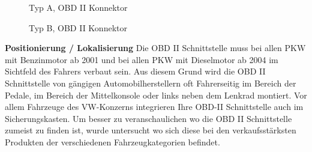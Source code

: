 \begin{figure}[!htb]\centering
   \begin{minipage}{0.49\textwidth}
     \caption{Typ A, OBD II Konnektor \cite{OBDII.TypeA}}\label{Fig:Data1}
   \end{minipage}
   \begin {minipage}{0.49\textwidth}
     \caption{Typ B, OBD II Konnektor \cite{OBDII.TypeB}}\label{Fig:Data2}
   \end{minipage}
\end{figure}


\textbf{Positionierung / Lokalisierung\nextline}
Die OBD II Schnittstelle muss bei allen PKW mit Benzinmotor ab 2001 und bei allen PKW mit Dieselmotor ab 2004 im Sichtfeld des Fahrers verbaut sein. Aus diesem Grund wird die OBD II Schnittstelle von gängigen Automobilherstellern oft Fahrerseitig im Bereich der Pedale, im Bereich der Mittelkonsole oder links neben dem Lenkrad montiert. Vor allem Fahrzeuge des VW-Konzerns integrieren Ihre OBD-II Schnittstelle auch im Sicherungskasten. Um besser zu veranschaulichen wo die OBD II Schnittstelle zumeist zu finden ist, wurde untersucht wo sich diese bei den verkaufsstärksten Produkten der verschiedenen Fahrzeugkategorien befindet.

